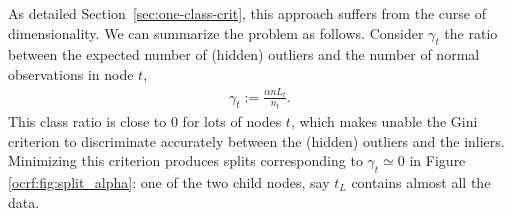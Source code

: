 As detailed Section~\ref{sec:one-class-crit}, this approach suffers from the curse of dimensionality. 
We can summarize the problem as follows.
Consider $\gamma_t$ the ratio between the expected number of (hidden) outliers and the number of normal observations in node $t$, %
\begin{align}
\label{ocrf:def:gamma_t}
\gamma_t := \frac{\alpha n L_t}{n_t}.
\end{align}
This class ratio is close to $0$ for lots of nodes $t$, which makes unable the Gini criterion to discriminate accurately between the (hidden) outliers and the inliers.
%
%
%
Minimizing this criterion produces splits corresponding to $\gamma_t\simeq 0$ in Figure \ref{ocrf:fig:split_alpha}: one of the two child nodes, say $t_L$ contains almost all the data. 
%

